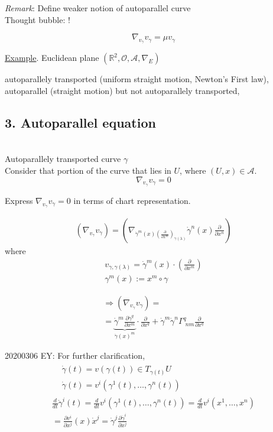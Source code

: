 \documentclass[10pt]{amsart}
\begin{document}
\begin{multicols*}{2}
\emph{Remark}: Define weaker notion of autoparallel curve \\
Thought bubble: !

\[
\nabla_{v_{\gamma}} v_{\gamma} = \mu v_{\gamma} 
\]

\underline{Example}. Euclidean plane $(\mathbb{R}^2, \mathcal{O}, \mathcal{A}, \nabla_E)$

autoparallely transported (uniform straight motion, Newton's First law), autoparallel (straight motion) but not autoparallely transported, 

\subsection*{3. Autoparallel equation}

\quad \\
Autoparallely transported curve $\gamma$ \\
Consider that portion of the curve that lies in $U$, where $(U, x) \in \mathcal{A}$.
\[
\nabla_{v_{\gamma}} v_{\gamma} = 0 
\]

Express $\nabla_{v_{\gamma}} v_{\gamma} = 0$ in terms of chart representation.

\[
\begin{gathered}
 (\nabla_{v_{\gamma}} v_{\gamma}) = \left( \nabla_{\dot{\gamma}^m(x)\left( \frac{\partial}{\partial x^m} \right)_{\gamma(\lambda)} } \dot{\gamma}^n(x) \frac{\partial}{\partial x^n} \right) 
\end{gathered}
\]
where
\[
\begin{gathered} 
	v_{\gamma, \gamma(\lambda)} = \dot{\gamma}^m(x) \cdot \left( \frac{\partial}{\partial x^m} \right) \\ 
	\gamma^m(x) := x^m \circ \gamma 
\end{gathered} 
\]

\[
\begin{gathered}
\Longrightarrow (\nabla_{v_{\gamma}} v_{\gamma}) =  \\
 = \underbrace{ \dot{\gamma}^m \frac{\partial \dot{\gamma}^q }{ \partial x^m} }_{\ddot{\gamma}(x)^m } \cdot \frac{\partial }{ \partial x^q} + \dot{\gamma}^m \dot{\gamma}^n \Gamma^q_{ \, \, nm} \frac{\partial}{\partial x^q}
\end{gathered}
\]

20200306 EY: For further clarification, 
\[
\begin{gathered} 
\begin{aligned} 
 	& \dot{\gamma}(t) = v(\gamma(t)) \in T_{\gamma(t)}U \\ 
	& \dot{\gamma}(t) = v^i(\gamma^1(t), \dots, \gamma^n(t))
\end{aligned} \\ 
 \frac{d}{dt} \dot{\gamma}^i(t) = \frac{d}{dt} v^i(\gamma^1(t), \dots , \gamma^n(t)) = \frac{d}{dt} v^i(x^1 , \dots , x^n) \\
 = \frac{\partial v^i}{\partial x^j}(x) \dot{x}^j = \dot{\gamma}^j \frac{\partial \dot{\gamma}^i}{\partial x^j}
\end{gathered} 
\]


\end{multicols*}
\end{document}
